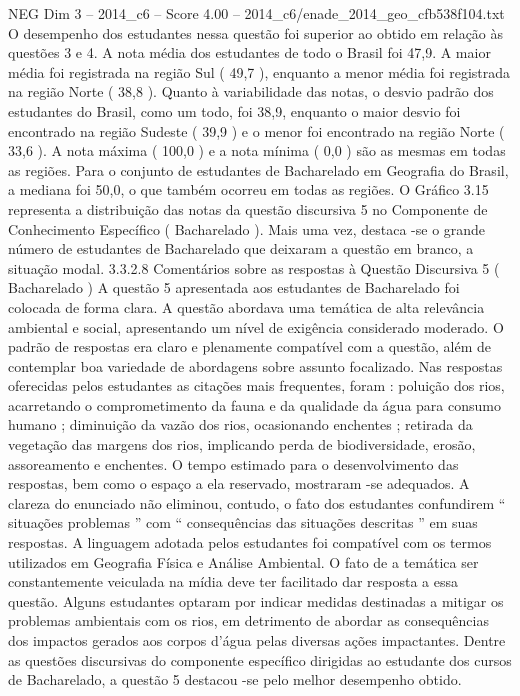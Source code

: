\begin{textsample}{NEG Dim 3 – 2014\_c6 – Score 4.00 – 2014\_c6/enade\_2014\_geo\_cfb538f104.txt}
O desempenho dos estudantes nessa questão foi superior ao obtido em relação às questões 3 e 4.
A nota média dos estudantes de todo o Brasil foi 47,9.
A maior média foi registrada na região Sul ( 49,7 ), enquanto a menor média foi registrada na região Norte ( 38,8 ).
Quanto à variabilidade das notas, o desvio padrão dos estudantes do Brasil, como um todo, foi 38,9, enquanto o maior desvio foi encontrado na região Sudeste ( 39,9 ) e o menor foi encontrado na região Norte ( 33,6 ).
A nota máxima ( 100,0 ) e a nota mínima ( 0,0 ) são as mesmas em todas as regiões.
Para o conjunto de estudantes de Bacharelado em Geografia do Brasil, a mediana foi 50,0, o que também ocorreu em todas as regiões.
O Gráfico 3.15 representa a distribuição das notas da questão discursiva 5 no Componente de Conhecimento Específico ( Bacharelado ).
Mais uma vez, destaca -se o grande número de estudantes de Bacharelado que deixaram a questão em branco, a situação modal. 3.3.2.8 Comentários sobre as respostas à Questão Discursiva 5 ( Bacharelado ) A questão 5 apresentada aos estudantes de Bacharelado foi colocada de forma clara.
A questão abordava uma temática de alta relevância ambiental e social, apresentando um nível de exigência considerado moderado.
O padrão de respostas era claro e plenamente compatível com a questão, além de contemplar boa variedade de abordagens sobre assunto focalizado.
Nas respostas oferecidas pelos estudantes as citações mais frequentes, foram : poluição dos rios, acarretando o comprometimento da fauna e da qualidade da água para consumo humano ; diminuição da vazão dos rios, ocasionando enchentes ; retirada da vegetação das margens dos rios, implicando perda de biodiversidade, erosão, assoreamento e enchentes.
O tempo estimado para o desenvolvimento das respostas, bem como o espaço a ela reservado, mostraram -se adequados.
A clareza do enunciado não eliminou, contudo, o fato dos estudantes confundirem “ situações problemas ” com “ consequências das situações descritas ” em suas respostas.
A linguagem adotada pelos estudantes foi compatível com os termos utilizados em Geografia Física e Análise Ambiental.
O fato de a temática ser constantemente veiculada na mídia deve ter facilitado dar resposta a essa questão.
Alguns estudantes optaram por indicar medidas destinadas a mitigar os problemas ambientais com os rios, em detrimento de abordar as consequências dos impactos gerados aos corpos d'água pelas diversas ações impactantes.
Dentre as questões discursivas do componente específico dirigidas ao estudante dos cursos de Bacharelado, a questão 5 destacou -se pelo melhor desempenho obtido.

\end{textsample}
